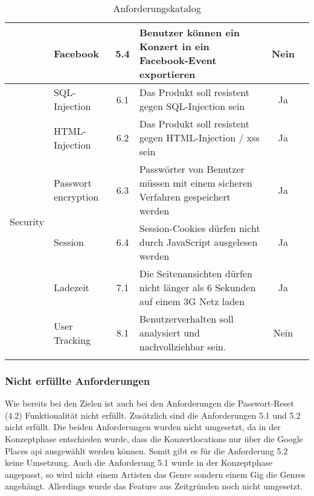 \begin{longtable}[]{@{}p{1.9cm}p{2.5cm}cp{5.5cm}cc@{}}
                                  & Facebook                   & 5.4          & Benutzer können ein Konzert in ein Facebook-Event exportieren                                               & Nein                            \\
  \midrule
  \multirow{9}{*}{Security}       & SQL-Injection              & 6.1          & Das Produkt soll resistent gegen SQL-Injection sein                                                         & Ja                              \\ \cline{2-6}
                                  & HTML-Injection             & 6.2          & Das Produkt soll resistent gegen HTML-Injection / \acrshort{xss} sein                                       & Ja                              \\ \cline{2-6}
                                  & Passwort encryption        & 6.3          & Passwörter von Benutzer müssen mit einem sicheren Verfahren gespeichert werden                              & Ja                              \\ \cline{2-6}
                                  & Session                    & 6.4          & Session-Cookies dürfen nicht durch JavaScript ausgelesen werden                                             & Ja                              \\
  \midrule
  Performance                     & Ladezeit                   & 7.1          & Die Seitenansichten dürfen nicht länger als 6 Sekunden auf einem 3G Netz laden                              & Ja                              \\
  \midrule
  Sonstiges                       & User Tracking              & 8.1          & Benutzerverhalten soll analysiert und nachvollziehbar sein.                                                 & Nein                            \\
  \bottomrule
  \caption{Anforderungskatalog}
\end{longtable}

\subsubsection{Nicht erfüllte Anforderungen}

Wie bereits bei den Zielen ist auch bei den Anforderungen die Passwort-Reset (4.2)
Funktionalität nicht erfüllt.
Zusätzlich sind die Anforderungen 5.1 und 5.2 nicht erfüllt. Die beiden
Anforderungen wurden nicht umgesetzt, da in der Konzeptphase entschieden wurde,
dass die Konzertlocations nur über die Google Places \acrshort{api} ausgewählt werden können.
Somit gibt es für die Anforderung 5.2 keine Umsetzung.
Auch die Anforderung 5.1 wurde in der Konzeptphase angepasst, so wird nicht einem
Artisten das Genre sondern einem Gig die Genres angehängt. Allerdings wurde das
Feature aus Zeitgründen noch nicht umgesetzt.

